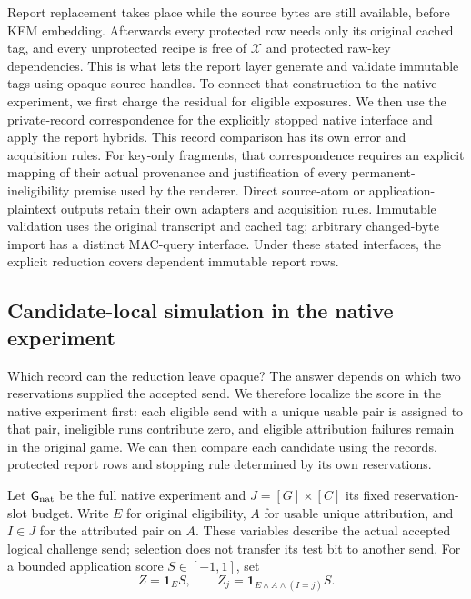 \documentclass[pdflatex]{sn-jnl}
\theoremstyle{thmstyleone}
\theoremstyle{thmstylethree}
\theoremstyle{thmstyletwo}
\begin{document}
Report replacement takes place while the source bytes are still available,
before KEM embedding. Afterwards every protected row needs only its original
cached tag, and every unprotected recipe is free of $\mathcal X$ and protected
raw-key dependencies. This is what lets the report layer generate and
validate immutable tags using opaque source handles. To connect that
construction to the native experiment, we first charge the residual for
eligible exposures. We then use the private-record correspondence for the
explicitly stopped native interface and apply the report hybrids.
This record comparison has its own error and acquisition rules. For
key-only fragments, that correspondence requires an explicit mapping of
their actual provenance and justification of every permanent-ineligibility
premise used by the renderer.
Direct source-atom or application-plaintext outputs retain their own
adapters and acquisition rules. Immutable validation uses the original
transcript and cached tag; arbitrary changed-byte import has a distinct
MAC-query interface. Under these stated interfaces, the explicit reduction
covers dependent immutable report rows.
\subsection{Candidate-local simulation in the native experiment}
\label{sec:candidate-local-accounting}

Which record can the reduction leave opaque? The answer depends on
which two reservations supplied the accepted send. We therefore localize
the score in the native experiment first: each eligible send with a unique
usable pair is assigned to that pair, ineligible runs contribute zero,
and eligible attribution failures remain in the original game. We can then
compare each candidate using the records, protected report rows
and stopping rule determined by its own reservations.

Let $\mathsf G_{\rm nat}$ be the full native experiment and
$J=[G]\times[C]$ its fixed reservation-slot budget.  Write $E$ for original
eligibility, $A$ for usable unique attribution, and $I\in J$ for the attributed
pair on $A$.  These variables describe the actual accepted logical challenge
send; selection does not transfer its test bit to another send.  For a bounded
application score $S\in[-1,1]$, set
\[
 Z=\mathbf1_E S,\qquad
 Z_j=\mathbf1_{E\land A\land(I=j)}S.
\]
\end{document}
